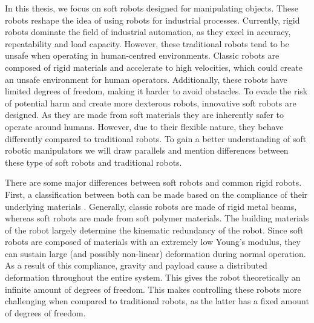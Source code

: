 In this thesis, we focus on soft robots designed for manipulating objects. These robots reshape the idea of using robots for industrial processes. Currently, rigid robots dominate the field of industrial automation, as they excel in accuracy, repeatability and load capacity. However, these traditional robots tend to be unsafe when operating in human-centred environments. Classic robots are composed of rigid materials and accelerate to high velocities, which could create an unsafe environment for human operators. Additionally, these robots have limited degrees of freedom, making it harder to avoid obstacles. To evade the risk of potential harm and create more dexterous robots, innovative soft robots are designed. As they are made from soft materials they are inherently safer to operate around humans. However, due to their flexible nature, they behave differently compared to traditional robots. To gain a better understanding of soft robotic manipulators we will draw parallels and mention differences between these type of soft robots and traditional robots. 


There are some major differences between soft robots and common rigid robots. First, a classification between both can be made based on the compliance of their underlying materials \cite{Bionics2008}. Generally, classic robots are made of rigid metal beams, whereas soft robots are made from soft polymer materials. The building materials of the robot largely determine the kinematic redundancy of the robot. Since soft robots are composed of materials with an extremely low Young's modulus, they can sustain large (and possibly non-linear) deformation during normal operation. As a result of this compliance, gravity and payload cause a distributed deformation throughout the entire system. This gives the robot theoretically an infinite amount of degrees of freedom. This makes controlling these robots more challenging when compared to traditional robots, as the latter has a fixed amount of degrees of freedom.

